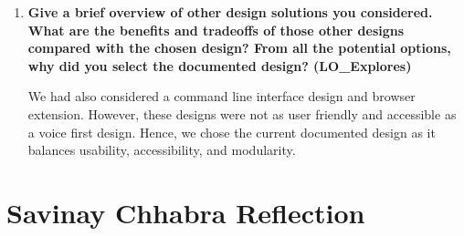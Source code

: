 \documentclass[12pt, titlepage]{article}
\begin{document}
\begin{enumerate}
\item \textbf{Give a brief overview of other design solutions you
considered. What are the benefits and tradeoffs of those other
designs compared with the chosen design? From all the potential
options, why did you select the documented design? (LO\_Explores)}

We had also considered a command line interface design and browser extension.
However, these designs were not as user friendly and accessible as a voice
first design. Hence, we chose the current documented design as it balances
usability, accessibility, and modularity.

\end{enumerate}

\section*{Savinay Chhabra Reflection}
\end{document}
